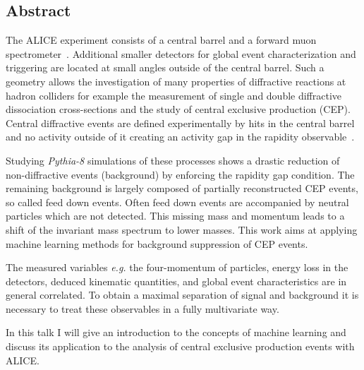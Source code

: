 \documentclass{article}
\begin{document}
\subsection*{Abstract}
The ALICE experiment consists of a central barrel and a forward muon
spectrometer~\cite{Aamodt:2008zz}. Additional smaller detectors for global event
characterization and triggering are located at small angles outside of
the central barrel. Such a geometry allows the investigation of many
properties of diffractive reactions at hadron colliders for example the
measurement of single and double diffractive dissociation cross-sections
and the study of central exclusive production (CEP). Central diffractive
events are defined experimentally by hits in the central barrel and no
activity outside of it creating an activity gap in the
rapidity observable~\cite{Schicker:2014wvk}.

Studying \emph{Pythia-8} simulations of these processes shows a drastic
reduction of non-diffractive events (background) by enforcing the
rapidity gap condition. The remaining background is largely composed of
partially reconstructed CEP events, so called feed down events. Often
feed down events are accompanied by neutral particles which are not
detected. This missing mass and momentum leads to a shift of the
invariant mass spectrum to lower masses. This work aims at applying machine
learning methods for background suppression of CEP events. 

The measured variables \emph{e.g.} the four-momentum of particles, energy loss in the 
detectors, deduced kinematic quantities, and global event characteristics are in general correlated. 
To obtain a maximal separation of signal and background it is necessary to treat these observables in a
fully multivariate way.

In this talk I will give an introduction to the concepts of machine learning and discuss its application to the 
analysis of central exclusive production events with ALICE.




 
\end{document}
